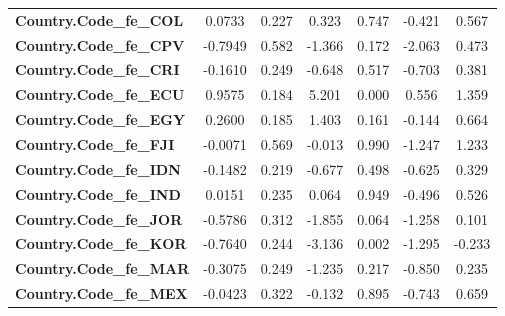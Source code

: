 \begin{center}
\begin{tabular}{lcccccc}
\textbf{Country.Code\_fe\_COL}                                     &       0.0733  &        0.227     &     0.323  &         0.747        &       -0.421    &        0.567     \\
\textbf{Country.Code\_fe\_CPV}                                     &      -0.7949  &        0.582     &    -1.366  &         0.172        &       -2.063    &        0.473     \\
\textbf{Country.Code\_fe\_CRI}                                     &      -0.1610  &        0.249     &    -0.648  &         0.517        &       -0.703    &        0.381     \\
\textbf{Country.Code\_fe\_ECU}                                     &       0.9575  &        0.184     &     5.201  &         0.000        &        0.556    &        1.359     \\
\textbf{Country.Code\_fe\_EGY}                                     &       0.2600  &        0.185     &     1.403  &         0.161        &       -0.144    &        0.664     \\
\textbf{Country.Code\_fe\_FJI}                                     &      -0.0071  &        0.569     &    -0.013  &         0.990        &       -1.247    &        1.233     \\
\textbf{Country.Code\_fe\_IDN}                                     &      -0.1482  &        0.219     &    -0.677  &         0.498        &       -0.625    &        0.329     \\
\textbf{Country.Code\_fe\_IND}                                     &       0.0151  &        0.235     &     0.064  &         0.949        &       -0.496    &        0.526     \\
\textbf{Country.Code\_fe\_JOR}                                     &      -0.5786  &        0.312     &    -1.855  &         0.064        &       -1.258    &        0.101     \\
\textbf{Country.Code\_fe\_KOR}                                     &      -0.7640  &        0.244     &    -3.136  &         0.002        &       -1.295    &       -0.233     \\
\textbf{Country.Code\_fe\_MAR}                                     &      -0.3075  &        0.249     &    -1.235  &         0.217        &       -0.850    &        0.235     \\
\textbf{Country.Code\_fe\_MEX}                                     &      -0.0423  &        0.322     &    -0.132  &         0.895        &       -0.743    &        0.659     \\

\end{tabular}
\end{center}

